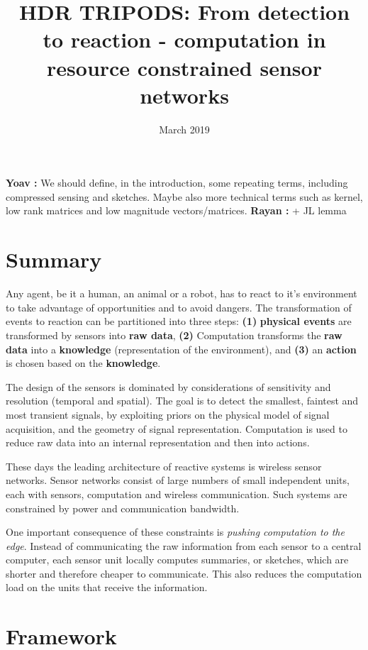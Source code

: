 \documentclass{article}
\title{HDR TRIPODS: From detection to reaction - computation in resource constrained sensor networks}
\date{March 2019}
\newcommand{\comment}[3]{{\color{#1} {\bf #2 :} #3}}
\newcommand{\yoav}[1]{\comment{magenta}{Yoav}{#1}}
\newcommand{\rayan}[1]{\comment{red}{Rayan}{#1}}
\begin{document}
\maketitle
\yoav{We should define, in the introduction, some repeating terms, including compressed sensing and sketches. Maybe also more technical terms such as kernel, low rank matrices and low magnitude vectors/matrices.}\rayan{+ JL lemma}

\section{Summary}
Any agent, be it a human, an animal or a robot, has to react to it's environment to take advantage of opportunities and to avoid dangers. The transformation of events to reaction can be partitioned into three steps: {\bf(1)} {\bf physical events} are transformed by sensors into {\bf raw data}, {\bf (2)} Computation transforms the {\bf raw data} into a {\bf knowledge} (representation of the environment), and {\bf (3)} an {\bf action} is chosen based on the {\bf knowledge}.

The design of the sensors is dominated by considerations of sensitivity and resolution (temporal and spatial).  The goal is to detect the smallest, faintest and most transient signals,
by exploiting priors on the physical model of signal acquisition, and the geometry of signal representation. Computation is used to reduce raw data into an internal representation and then into actions. 

These days the leading architecture of reactive systems is wireless sensor networks. Sensor networks consist of large numbers of small independent units, each with sensors, computation and wireless communication. Such systems are constrained by power and communication bandwidth. 

One important consequence of these constraints is {\em pushing computation to the edge}. Instead of communicating the raw information from each sensor to a central computer, each sensor unit locally computes summaries, or sketches, which are shorter and therefore cheaper to communicate. This also reduces the computation load on the units that receive the information.

\section{Framework}
\newcommand{\state}{\theta}
\newcommand{\estate}{\hat{\theta}}
\newcommand{\Vstate}{\Theta}
\newcommand{\eVstate}{\hat{\Theta}}
\newcommand{\Sstate}{\psi}
\newcommand{\eSstate}{\hat{\psi}}
\newcommand{\VSstate}{\Psi}
\newcommand{\eVSstate}{\hat{\Psi}}
\newcommand{\env}{\mathbf{E}}
\newcommand{\transfer}{\mathbf{\Phi}}
\end{document}
